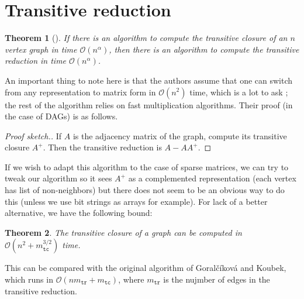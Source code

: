 \documentclass[11pt,a4paper]{article}
\newcommand{\BigO}{\mathcal O}
\newtheorem{Theo}{Theorem}
\theoremstyle{definition}
\begin{document}
\section{Transitive reduction}
\begin{Theo}[\cite{aho1972transitive}]
If there is an algorithm to compute the transitive closure of an $n$ vertex
graph in time $\BigO(n^\alpha)$, then there is an algorithm to compute 
the transitive reduction in time $\BigO(n^\alpha)$.
\end{Theo}
An important thing to note here is that the authors assume that 
one can switch from any representation to matrix form in $\BigO(n^2)$ time, 
which is a lot to ask ; the rest of the algorithm relies on 
fast multiplication algorithms. Their proof (in the case of DAGs) is as follows.
\begin{proof}[Proof sketch.]
If $A$ is the adjacency matrix of the graph, compute its transitive closure
$A^+$. Then the transitive reduction is $A-AA^+$.
\end{proof}
If we wish to adapt this algorithm to the case of sparse matrices, we can try 
to tweak our algorithm so it sees $A^+$ as a complemented representation (each
vertex has list of non-neighbors) but there does not seem to be an 
obvious way to do this (unless we use bit strings as arrays for example).
For lack of a better alternative, we have
the following bound:
\begin{Theo}
The transitive closure of a graph can be computed in
$\BigO\left(n^2 + m_{\texttt{tc}}^{3/2}\right)$ time.
\end{Theo}

This can be compared with the original algorithm of 
Goral{\v{c}}{\'{i}}kov{\'{a}} and Koubek, which runs 
in $\BigO\left(nm_{\texttt{tr}} + m_{\texttt{tc}}\right)$, where
$m_{\texttt{tr}}$ is the nujmber of edges in the transitive reduction.





\newpage
\printbibliography
\newpage
\end{document}
